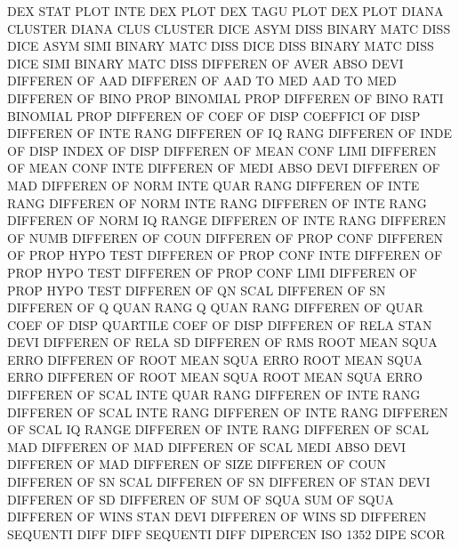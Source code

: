 DEX      STAT PLOT INTE                 DEX      PLOT
DEX      TAGU PLOT                      DEX      PLOT
DIANA                                   CLUSTER
DIANA    CLUS                           CLUSTER
DICE     ASYM DISS                      BINARY   MATC DISS
DICE     ASYM SIMI                      BINARY   MATC DISS
DICE     DISS                           BINARY   MATC DISS
DICE     SIMI                           BINARY   MATC DISS
DIFFEREN OF   AVER ABSO DEVI            DIFFEREN OF   AAD
DIFFEREN OF   AAD  TO   MED             AAD      TO   MED
DIFFEREN OF   BINO PROP                 BINOMIAL PROP
DIFFEREN OF   BINO RATI                 BINOMIAL PROP
DIFFEREN OF   COEF OF   DISP            COEFFICI OF   DISP
DIFFEREN OF   INTE RANG                 DIFFEREN OF   IQ   RANG
DIFFEREN OF   INDE OF   DISP            INDEX    OF   DISP
DIFFEREN OF   MEAN CONF LIMI            DIFFEREN OF   MEAN CONF INTE
DIFFEREN OF   MEDI ABSO DEVI            DIFFEREN OF   MAD
DIFFEREN OF   NORM INTE QUAR RANG       DIFFEREN OF   INTE RANG
DIFFEREN OF   NORM INTE RANG            DIFFEREN OF   INTE RANG
DIFFEREN OF   NORM IQ   RANGE           DIFFEREN OF   INTE RANG
DIFFEREN OF   NUMB                      DIFFEREN OF   COUN
DIFFEREN OF   PROP CONF                 DIFFEREN OF   PROP HYPO TEST
DIFFEREN OF   PROP CONF INTE            DIFFEREN OF   PROP HYPO TEST
DIFFEREN OF   PROP CONF LIMI            DIFFEREN OF   PROP HYPO TEST
DIFFEREN OF   QN   SCAL                 DIFFEREN OF   SN
DIFFEREN OF   Q    QUAN RANG            Q        QUAN RANG
DIFFEREN OF   QUAR COEF OF   DISP       QUARTILE COEF OF   DISP
DIFFEREN OF   RELA STAN DEVI            DIFFEREN OF   RELA SD
DIFFEREN OF   RMS                       ROOT     MEAN SQUA ERRO
DIFFEREN OF   ROOT MEAN SQUA ERRO       ROOT     MEAN SQUA ERRO
DIFFEREN OF   ROOT MEAN SQUA            ROOT     MEAN SQUA ERRO
DIFFEREN OF   SCAL INTE QUAR RANG       DIFFEREN OF   INTE RANG
DIFFEREN OF   SCAL INTE RANG            DIFFEREN OF   INTE RANG
DIFFEREN OF   SCAL IQ   RANGE           DIFFEREN OF   INTE RANG
DIFFEREN OF   SCAL MAD                  DIFFEREN OF   MAD
DIFFEREN OF   SCAL MEDI ABSO DEVI       DIFFEREN OF   MAD
DIFFEREN OF   SIZE                      DIFFEREN OF   COUN
DIFFEREN OF   SN   SCAL                 DIFFEREN OF   SN
DIFFEREN OF   STAN DEVI                 DIFFEREN OF   SD
DIFFEREN OF   SUM  OF   SQUA            SUM      OF   SQUA
DIFFEREN OF   WINS STAN DEVI            DIFFEREN OF   WINS SD
DIFFEREN                                SEQUENTI DIFF
DIFF                                    SEQUENTI DIFF
DIPERCEN                                ISO      1352 DIPE SCOR
